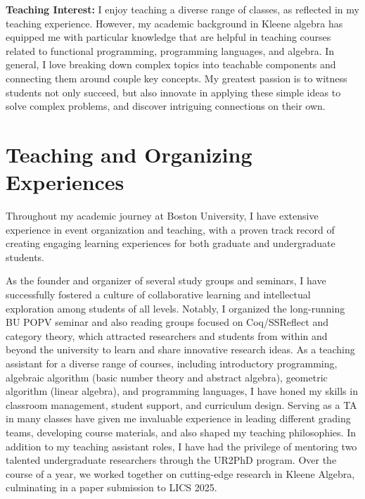 \documentclass[11pt,a4paper,sans]{moderncv} %
\begin{document}
\textbf{Teaching Interest:}
I enjoy teaching a diverse range of classes, as reflected in my teaching experience. 
However, my academic background in Kleene algebra has equipped me with particular knowledge that are helpful in teaching courses related to functional programming, programming languages, and algebra. 
In general, I love breaking down complex topics into teachable components and connecting them around couple key concepts.
My greatest passion is to witness students not only succeed, but also innovate in applying these simple ideas to solve complex problems, and discover intriguing connections on their own.

\newpage %
\section{Teaching and Organizing Experiences}

Throughout my academic journey at Boston University, I have extensive experience in event organization and teaching, with a proven track record of creating engaging learning experiences for both graduate and undergraduate students.

As the founder and organizer of several study groups and seminars, I have successfully fostered a culture of collaborative learning and intellectual exploration among students of all levels. 
Notably, I organized the long-running BU POPV seminar and also reading groups focused on Coq/SSReflect and category theory, which attracted researchers and students from within and beyond the university to learn and share innovative research ideas.
As a teaching assistant for a diverse range of courses, including introductory programming, algebraic algorithm (basic number theory and abstract algebra), geometric algorithm (linear algebra), and programming languages, I have honed my skills in classroom management, student support, and curriculum design. 
Serving as a TA in many classes have given me invaluable experience in leading different grading teams, developing course materials, and also shaped my teaching philosophies.
In addition to my teaching assistant roles, I have had the privilege of mentoring two talented undergraduate researchers through the UR2PhD program. 
Over the course of a year, we worked together on cutting-edge research in Kleene Algebra, culminating in a paper submission to LICS 2025.
\end{document}
